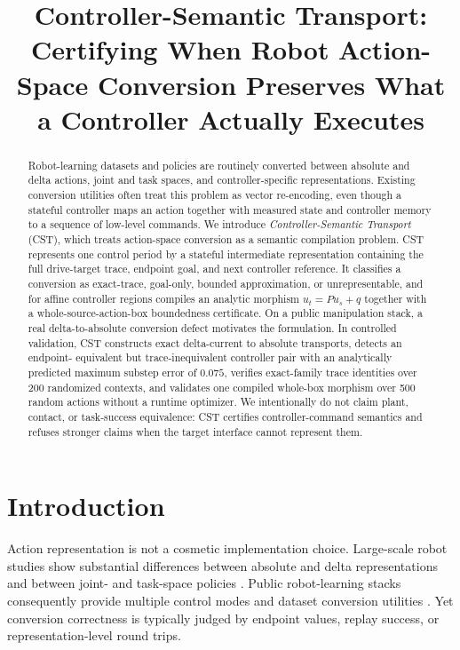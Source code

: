 \documentclass[conference]{IEEEtran}
\title{Controller-Semantic Transport: Certifying When Robot Action-Space Conversion Preserves What a Controller Actually Executes}
\author{\IEEEauthorblockN{Anonymous Authors}}
\begin{document}
\maketitle

\begin{abstract}
Robot-learning datasets and policies are routinely converted between absolute
and delta actions, joint and task spaces, and controller-specific
representations. Existing conversion utilities often treat this problem as
vector re-encoding, even though a stateful controller maps an action together
with measured state and controller memory to a sequence of low-level commands.
We introduce \emph{Controller-Semantic Transport} (CST), which treats
action-space conversion as a semantic compilation problem. CST represents one
control period by a stateful intermediate representation containing the full
drive-target trace, endpoint goal, and next controller reference. It classifies
a conversion as exact-trace, goal-only, bounded approximation, or
unrepresentable, and for affine controller regions compiles an analytic
morphism $u_t=P u_s+q$ together with a whole-source-action-box boundedness
certificate. On a public manipulation stack, a real delta-to-absolute
conversion defect motivates the formulation. In controlled validation, CST
constructs exact delta-current to absolute transports, detects an endpoint-
equivalent but trace-inequivalent controller pair with an analytically predicted
maximum substep error of $0.075$, verifies exact-family trace identities over
200 randomized contexts, and validates one compiled whole-box morphism over 500
random actions without a runtime optimizer. We intentionally do not claim plant,
contact, or task-success equivalence: CST certifies controller-command
semantics and refuses stronger claims when the target interface cannot represent
them.
\end{abstract}

\section{Introduction}
Action representation is not a cosmetic implementation choice. Large-scale
robot studies show substantial differences between absolute and delta
representations and between joint- and task-space policies
\cite{feng2026action}. Public robot-learning stacks consequently provide
multiple control modes and dataset conversion utilities
\cite{tao2025maniskill3,mimic2021}. Yet conversion correctness is typically
judged by endpoint values, replay success, or representation-level
round trips.
\end{document}
